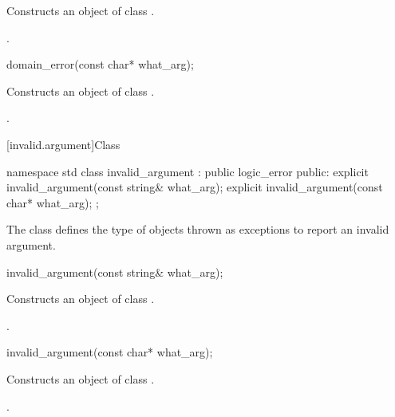\begin{itemdescr}
\pnum
\effects
Constructs an object of class
.

\pnum
\postcondition
{}.
\end{itemdescr}

%
\begin{itemdecl}
domain_error(const char* what_arg);
\end{itemdecl}

\begin{itemdescr}
\pnum
\effects
Constructs an object of class
.

\pnum
\postcondition
{}.
\end{itemdescr}

[invalid.argument]{Class }

%
\begin{codeblock}
namespace std {
  class invalid_argument : public logic_error {
  public:
    explicit invalid_argument(const string& what_arg);
    explicit invalid_argument(const char* what_arg);
  };
}
\end{codeblock}

\pnum
The class
defines the type of objects thrown as exceptions to report an invalid argument.

%
\begin{itemdecl}
invalid_argument(const string& what_arg);
\end{itemdecl}

\begin{itemdescr}
\pnum
\effects
Constructs an object of class
.

\pnum
\postcondition
{}.
\end{itemdescr}

%
\begin{itemdecl}
invalid_argument(const char* what_arg);
\end{itemdecl}

\begin{itemdescr}
\pnum
\effects
Constructs an object of class
.

\pnum
\postcondition
{}.
\end{itemdescr}

